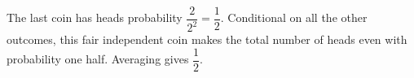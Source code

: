 The last coin has heads probability $\dfrac{2}{2^2}=\dfrac{1}{2}$. Conditional on all the other outcomes, this fair independent coin makes the total number of heads even with probability one half. Averaging gives $\boxed{\dfrac{1}{2}}$.
